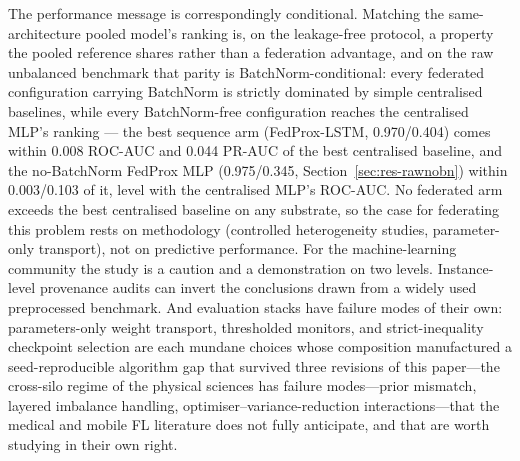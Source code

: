 The performance message is correspondingly conditional. Matching the
same-architecture pooled model's ranking is, on the leakage-free
protocol, a property the pooled reference shares rather than a
federation advantage, and on the raw unbalanced benchmark that parity
is BatchNorm-conditional: every federated configuration carrying
BatchNorm is strictly dominated by simple centralised baselines,
while every BatchNorm-free configuration reaches the centralised
MLP's ranking --- the best sequence arm (FedProx-LSTM, 0.970/0.404)
comes within 0.008 ROC-AUC and 0.044
PR-AUC of the best centralised baseline, and the no-BatchNorm
FedProx MLP (0.975/0.345, Section~\ref{sec:res-rawnobn}) within
0.003/0.103 of it, level with the centralised MLP's ROC-AUC. No
federated arm
exceeds the best centralised baseline on any substrate, so the case
for federating
this problem rests on methodology (controlled heterogeneity studies,
parameter-only transport), not on predictive performance. For the machine-learning community the study is a caution and a
demonstration on two levels. Instance-level provenance audits can
invert the conclusions drawn from a widely used preprocessed
benchmark. And evaluation stacks have failure modes of their own:
parameters-only weight transport, thresholded monitors, and
strict-inequality checkpoint selection are each mundane choices whose
composition manufactured a seed-reproducible algorithm gap that
survived three revisions of this paper---the cross-silo regime of the
physical sciences has failure modes---prior mismatch, layered
imbalance handling, optimiser--variance-reduction interactions---that
the medical and mobile FL literature does not fully anticipate, and
that are worth studying in their own right.
